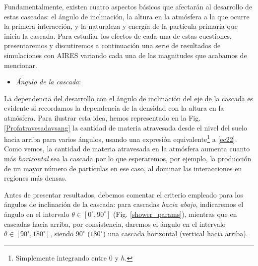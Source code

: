 \documentclass[11 pt, a4paper]{article} %
\numberwithin{equation}{section}
\numberwithin{figure}{section}
\numberwithin{table}{section}
\begin{document}
Fundamentalmente, existen cuatro aspectos básicos que afectarán al desarrollo de estas cascadas: el ángulo de inclinación, la altura en la atmósfera a la que ocurre la primera interacción, y la naturaleza y energía de la partícula primaria que inicia la cascada. Para estudiar los efectos de cada una de estas cuestiones, presentaremos y discutiremos a continuación una serie de resultados de simulaciones con AIRES variando cada una de las magnitudes que acabamos de mencionar.
\begin{itemize}
	\item \textit{Ángulo de la cascada}:
\end{itemize}
	La dependencia del desarrollo con el ángulo de inclinación del eje de la cascada es evidente si recordamos la dependencia de la densidad con la altura en la atmósfera. Para ilustrar esta idea, hemos representado en la Fig. \ref{Profatravesadavsang} la cantidad de materia atravesada desde el nivel del suelo hacia arriba para varios ángulos, usando una expresión equivalente\footnote{ Simplemente integrando entre $0$ y $h$.} a \eqref{ec22}. Como vemos, la cantidad de materia atravesada en la atmósfera aumenta cuanto más \textit{horizontal} sea la cascada por lo que esperaremos, por ejemplo, la producción de un mayor número de partículas en ese caso, al dominar las interacciones en regiones más densas.
	
	Antes de presentar resultados, debemos comentar el criterio empleado para los ángulos de inclinación de la cascada: para cascadas \textit{hacia abajo}, indicaremos el ángulo en el intervalo $\theta\in[0^\circ, 90^\circ]$ (Fig. \ref{shower_params}), mientras que en cascadas hacia arriba, por consistencia, daremos el ángulo en el intervalo  $\theta\in[90^\circ, 180^\circ]$, siendo $
	90^\circ$ ($180^\circ$) una cascada horizontal (vertical hacia arriba).
	
\end{document}
